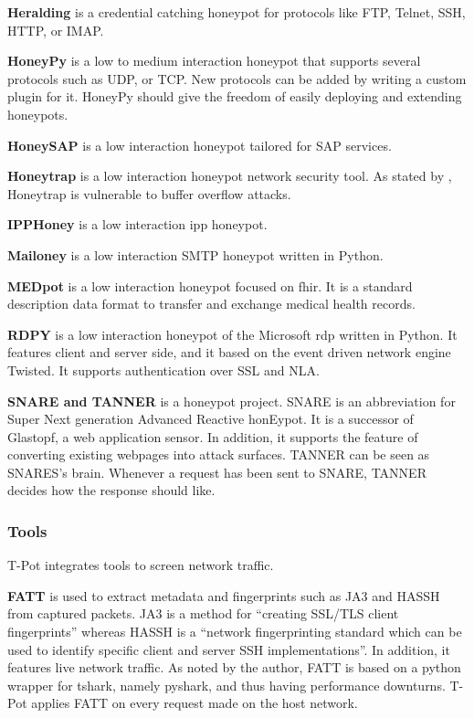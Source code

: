 \textbf{Heralding} \cite{heralding2021} is a credential catching honeypot for protocols like FTP, Telnet, SSH, HTTP, or IMAP.

\textbf{HoneyPy} \cite{honeysap2021} is a low to medium interaction honeypot that supports several protocols such as UDP, or TCP.
New protocols can be added by writing a custom plugin for it.
HoneyPy should give the freedom of easily deploying and extending honeypots.

\textbf{HoneySAP} \cite{honeysap2021} is a low interaction honeypot tailored for SAP services.

\textbf{Honeytrap} \cite{honeytrap2021} is a low interaction honeypot network security tool.
As stated by \citet*{honeytrap2021}, Honeytrap is vulnerable to buffer overflow attacks.

\textbf{IPPHoney} \cite{ipphoney2021} is a low interaction \ac{ipp} honeypot.

\textbf{Mailoney} \cite{mailoney2021} is a low interaction SMTP honeypot written in Python.

\textbf{MEDpot} \cite{medpot2021} is a low interaction honeypot focused on \ac{fhir}.
It is a standard description data format to transfer and exchange medical health records.

\textbf{RDPY} \cite{rdpy2021} is a low interaction honeypot of the Microsoft \ac{rdp} written in Python.
It features client and server side, and it based on the event driven network engine Twisted.
It supports authentication over SSL and NLA.

\textbf{SNARE and TANNER} \cite{snare2021, tanner2021} is a honeypot project.
SNARE is an abbreviation for Super Next generation Advanced Reactive honEypot.
It is a successor of Glastopf, a web application sensor.
In addition, it supports the feature of converting existing webpages into attack surfaces.
TANNER \cite{tanner2021} can be seen as SNARES's brain.
Whenever a request has been sent to SNARE, TANNER decides how the response should like.

\subsubsection{Tools}

T-Pot integrates tools to screen network traffic.

\textbf{FATT} \cite{fatt2021} is used to extract metadata and fingerprints such as JA3 \cite{ja32021} and HASSH \cite{hassh2021} from captured packets.
JA3 is a method for \enquote{creating SSL/TLS client fingerprints} whereas HASSH is a \enquote{network fingerprinting standard which can be used to identify specific client and server SSH implementations}.
In addition, it features live network traffic.
As noted by the author, FATT is based on a python wrapper for tshark, namely pyshark, and thus having performance downturns.
T-Pot applies FATT on every request made on the host network.

